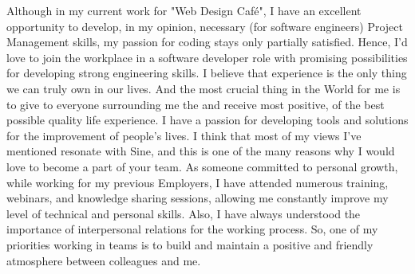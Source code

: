\documentclass[10pt, a4paper]{awesome-cv}
\begin{document}
\begin{cvletter}
Although in my current work for "Web Design Café", I have an excellent opportunity to develop, in my opinion, necessary (for software engineers) Project Management skills, my passion for coding stays only partially satisfied. Hence, I'd love to join the workplace in a software developer role with promising possibilities for developing strong engineering skills.
I believe that experience is the only thing we can truly own in our lives. And the most crucial thing in the World for me is to give to everyone surrounding me the and receive most positive, of the best possible quality life experience. I have a passion for developing tools and solutions for the improvement of people’s lives. I think that most of my views I’ve mentioned resonate with Sine, and this is one of the many reasons why I would love to become a part of your team.  
As someone committed to personal growth, while working for my previous Employers, I have attended numerous training, webinars, and knowledge sharing sessions, allowing me constantly improve my level of technical and personal skills. Also, I have always understood the importance of interpersonal relations for the working process. So, one of my priorities working in teams is to build and maintain a positive and friendly atmosphere between colleagues and me.

\end{cvletter}


\makeletterclosing
\end{document}

